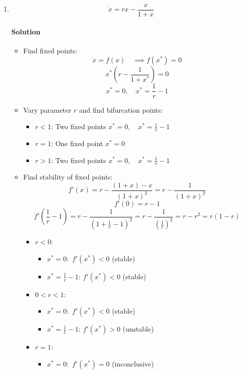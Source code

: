 \documentclass[11pt]{article}
\begin{document}
\begin{enumerate}
    \item[(b)] \[\dot{x} = rx - \frac{x}{1+x}\]
    \paragraph{Solution}\mbox{} 
    \begin{itemize}
        \item Find fixed points:
        \[\dot{x} = f(x)\quad \implies f(x^*) = 0\]
        \[x^*\left(r - \frac{1}{1+x^*}\right)=0\]
        \[x^* = 0,\quad x^* = \frac{1}{r}-1\]
        \item Vary parameter $r$ and find bifurcation points:
        \begin{itemize}
            \item $r<1$: Two fixed points $x^* = 0,\quad x^* = \frac{1}{r}-1$
            \item $r = 1$: One fixed point $x^* = 0$
            \item $r>1$: Two fixed points $x^* = 0,\quad x^* = \frac{1}{r}-1$
        \end{itemize}
        \item Find stability of fixed points:
        \[f'(x) = r-\frac{(1+x)-x}{(1+x)^2}=r-\frac{1}{(1+x)^2}\]
        \[f'(0) = r-1\]
        \[f'\left(\frac{1}{r}-1\right) = r-\frac{1}{\left(1+\frac{1}{r}-1\right)^2} = r-\frac{1}{\left(\frac{1}{r}\right)^2} = r-r^2 = r(1-r)\]
        \newpage
        \begin{itemize}
            \item $r<0$:
            \begin{itemize}
                \item $x^* = 0:$ $f'(x^*)<0$ (stable)
                \item $x^* = \frac{1}{r}-1$: $f'(x^*)<0$ (stable)
            \end{itemize}
            \item $0<r<1$: 
            \begin{itemize}
                \item $x^* = 0:$ $f'(x^*)<0$ (stable)
                \item $x^* = \frac{1}{r}-1$: $f'(x^*)>0$ (unstable)
            \end{itemize}
            \item $r = 1$:
            \begin{itemize}
                \item $x^*=0:$ $f'(x^*)=0$ (inconclusive)
            \end{itemize}

\end{itemize}
\end{itemize}
\end{enumerate}
\end{document}
